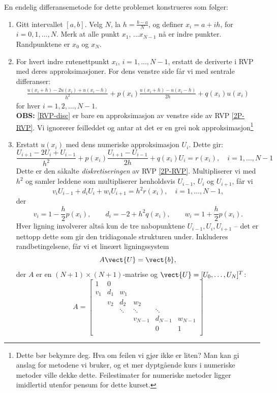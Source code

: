 En endelig differansemetode for dette problemet konstrueres som følger:

\begin{enumerate}
    \item Gitt intervallet \([a, b]\). Velg \( N \), la \( h = \frac{b - a}{N} \), og definer \( x_i = a + ih \), for \( i = 0, 1, \dots, N \). Merk at alle punkt $x_1,\, ...x_{N-1}$ nå er indre punkter. Randpunktene er \( x_0 \) og \( x_N \).
    
    \item For hvert indre rutenettpunkt \( x_i \), \( i = 1, \dots, N - 1 \), erstatt de deriverte i RVP med deres approksimasjoner. For dens venstre side får vi med sentrale differanser:
    \begin{align}\label{RVP-disc}
    \frac{u(x_i + h) - 2u(x_i) + u(x_i - h)}{h^2} + p(x_i) \frac{u(x_i + h) - u(x_i - h)}{2h} + q(x_i) u(x_i)
    \end{align}
    for hver $i=1,2,\ldots,N-1$.\\
    \textbf{OBS:} \eqref{RVP-disc} er bare en approksimasjon av venstre side av RVP \eqref{2P-RVP}. Vi ignorerer feilleddet og antar at det er en grei nok approksimasjon\footnote{Dette bør bekymre deg. Hva om feilen vi gjør ikke er liten?
Man kan gi anslag for metodene vi bruker, og et mer dyptgående kurs i numeriske metoder ville dekke dette.
Feilestimater for numeriske metoder ligger imidlertid utenfor pensum for dette kurset.}
    \item Erstatt \( u(x_i) \) med dens numeriske approksimasjon \( U_i \). Dette gir:
    \[
    \frac{U_{i+1} - 2U_i + U_{i-1}}{h^2} + p(x_i)\frac{U_{i+1} - U_{i-1}}{2h} + q(x_i) U_i = r(x_i), \quad i = 1, \dots, N - 1
    \]
    Dette er den såkalte \emph{diskretiseringen} av RVP \eqref{2P-RVP}. Multipliserer vi med \( h^2 \) og samler leddene som multipliserer henholdsvis \( U_{i-1} \), \( U_i \) og \( U_{i+1} \), får vi
    \begin{equation}\label{RVP-tridiag}
    v_i U_{i-1} + d_i U_i + w_i U_{i+1} = h^2 r(x_i), \quad i = 1, \dots, N-1,
    \end{equation}
    der
    \[
    v_i = 1 - \frac{h}{2}p(x_i), \qquad d_i = -2 + h^2 q(x_i), \qquad w_i = 1 + \frac{h}{2}p(x_i).
    \]
    Hver ligning involverer altså kun de tre nabopunktene \( U_{i-1}, U_i, U_{i+1} \) -- det er nettopp dette som gir den tridiagonale strukturen under. Inkluderes randbetingelsene, får vi et lineært ligningssystem
    \[
    A\vect{U} = \vect{b},
    \]
    der \( A \) er en \((N+1) \times (N+1)\)-matrise og \( \vect{U} = [U_0, \dots, U_N]^T \):
    \[
    A = \begin{bmatrix}
    1 & 0 & & & & \\
    v_1 & d_1 & w_1 & & & \\
    & v_2 & d_2 & w_2 & & \\
    & & \ddots & \ddots & \ddots & \\
    & & & v_{N-1} & d_{N-1} & w_{N-1} \\
    & & & & 0 & 1 \\
    \end{bmatrix}
    \]


\end{enumerate}
